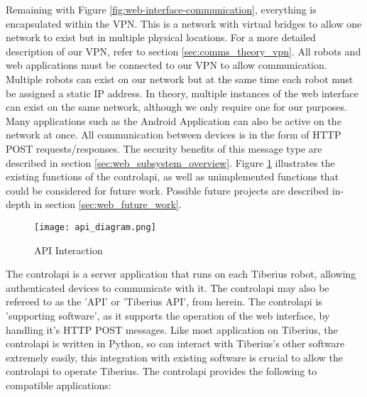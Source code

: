 \noindent
Remaining with Figure \ref{fig:web-interface-communication}, everything is encapsulated within the \gls{VPN}. This is a network with virtual bridges to allow one network to exist but in multiple physical locations. For a more detailed description of our \gls{VPN}, refer to section \ref{sec:comms_theory_vpn}. All robots and web applications must be connected to our \gls{VPN} to allow communication.
\newline
Multiple robots can exist on our network but at the same time each robot must be assigned a static IP address. In theory, multiple instances of the web interface can exist on the same network, although we only require one for our purposes. Many applications such as the Android Application can also be active on the network at once.
\newline
All communication between devices is in the form of \gls{HTTP} \gls{POST} requests/responses. The security benefits of this message type are described in section \ref{sec:web_subsystem_overview}.
\newline
Figure \ref{fig:api-interaction} illustrates the existing functions of the \gls{controlapi}, as well as unimplemented functions that could be considered for future work. Possible future projects are described in-depth in section \ref{sec:web_future_work}.
\begin{figure}[!htb]
\begin{center}
\texttt{[image: api\_diagram.png]}
\end{center}
\caption{API Interaction}
\label{fig:api-interaction}
\end{figure}
\noindent
The \gls{controlapi} is a server application that runs on each Tiberius robot, allowing authenticated devices to communicate with it. The \gls{controlapi} may also be refereed to as the 'API' or 'Tiberius API', from herein. The \gls{controlapi} is 'supporting software', as it supports the operation of the web interface, by handling it's \gls{HTTP} \gls{POST} messages. Like most application on Tiberius, the \gls{controlapi} is written in Python, so can interact with Tiberius's other software extremely easily, this integration with existing software is crucial to allow the \gls{controlapi} to operate Tiberius. The \gls{controlapi} provides the following to compatible applications:

